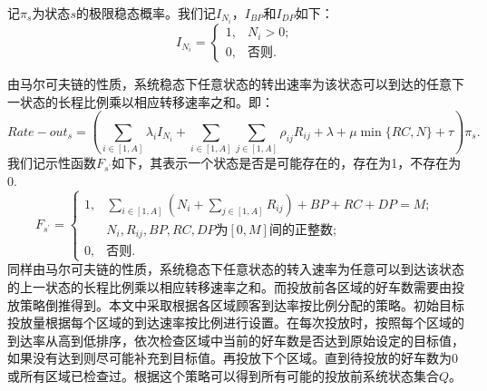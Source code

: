 \documentclass{article}
\begin{document}
记$\pi_s$为状态$s$的极限稳态概率。我们记$I_{N_i}$，$I_{BP}$和$I_{DP}$如下：
\begin{equation}
I_{N_i}=\left\{
    \begin{array}{lcl}
        1, &N_i > 0;\\
        0, &\mbox{否则}.
    \end{array}    
\right.
\end{equation}


由马尔可夫链的性质，系统稳态下任意状态的转出速率为该状态可以到达的任意下一状态的长程比例乘以相应转移速率之和。即：
\begin{equation}
Rate-out_{s} = (\sum \limits _{i \in [1,A]}\lambda_i I_{N_i}+\sum \limits _{i \in [1,A]} \sum \limits _{j \in [1,A]} \rho_{ij} R_{ij}+\lambda +\mu \min \{RC, N\} + \tau )\pi_s.
\end{equation}
我们记示性函数$F_{s^{'}}$如下，其表示一个状态是否是可能存在的，存在为1，不存在为0.
\begin{equation}
F_{s^{'}}=
    \left\{
        \begin{array}{lcl}
            1, &\sum \limits _{i \in [1,A]}(N_i+\sum \limits _{j \in [1,A]}R_{ij})+BP+RC+DP= M;\\ & N_i, R_{ij}, BP, RC, DP\mbox{为}[0,M]\mbox{间的正整数};\\
            0, &\mbox{否则}.
        \end{array}
    \right .  
\end{equation}
同样由马尔可夫链的性质，系统稳态下任意状态的转入速率为任意可以到达该状态的上一状态的长程比例乘以相应转移速率之和。而投放前各区域的好车数需要由投放策略倒推得到。本文中采取根据各区域顾客到达率按比例分配的策略。初始目标投放量根据每个区域的到达速率按比例进行设置。在每次投放时，按照每个区域的到达率从高到低排序，依次检查区域中当前的好车数是否达到原始设定的目标值，如果没有达到则尽可能补充到目标值。再投放下个区域。直到待投放的好车数为0或所有区域已检查过。根据这个策略可以得到所有可能的投放前系统状态集合$Q$。
\end{document}
